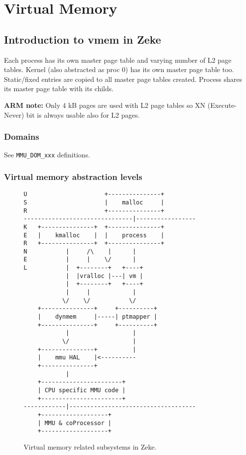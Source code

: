 \chapter{Virtual Memory}

\section{Introduction to vmem in Zeke}

Each process has its own master page table and varying number of L2 page
tables. Kernel (also abstracted as proc 0) has its own master page table
too. Static/fixed entries are copied to all master page tables created.
Process shares its master page table with its childs.

\textbf{ARM note:} Only 4 kB pages are used with L2 page tables so
XN (Execute-Never) bit is always usable also for L2 pages.

\subsection{Domains}

See \verb+MMU_DOM_xxx+ definitions.

\subsection{Virtual memory abstraction levels}

\begin{figure}
\begin{verbatim}
U                      +---------------+
S                      |    malloc     |
R                      +---------------+
-------------------------------|-----------------
K   +---------------+  +---------------+
E   |    kmalloc    |  |    process    |
R   +---------------+  +---------------+
N           |     /\    |      |
E           |     |    \/      |
L           |  +--------+   +----+
            |  |vralloc |---| vm |
            |  +--------+   +----+
            |     |            |
           \/    \/           \/
    +---------------+     +----------+
    |    dynmem     |-----| ptmapper |
    +---------------+     +----------+
            |                  |
           \/                  |
    +---------------+          |
    |    mmu HAL    |<----------
    +---------------+
            |
    +-----------------------+
    | CPU specific MMU code |
    +-----------------------+
------------|------------------------------------
    +-------------------+
    | MMU & coProcessor |
    +-------------------+
\end{verbatim}
\caption{Virtual memory related subsystems in Zeke.}
\label{figure:vmsubsys}
\end{figure}

